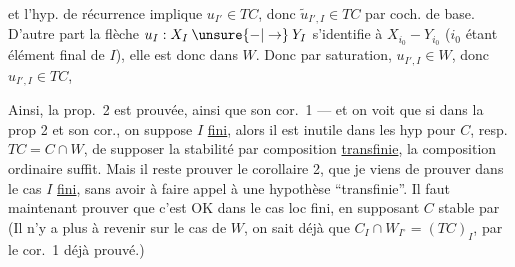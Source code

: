 
et l’hyp. de récurrence implique $u_{I'}\in TC$, donc $\widetilde u_{I',I}\in TC$ par coch. de base. D’autre part la flèche $u_I:X_I\mathbin{\unsure{-|\to}}Y_I$ s’identifie à $X_{i_0}\mathbin{-}Y_{i_0}$ ($i_0$ étant élément final de $I$), elle est donc dans $W$. Donc par saturation, $u_{I',I}\in W$, donc $u_{I',I}\in TC$, 

Ainsi, la prop.~2 est prouvée, ainsi que son cor.~1 --- et on voit que si dans la prop 2 et son cor., on suppose $I$ \uline{fini}, alors il est inutile dans les hyp pour $C$, resp. $TC=C\cap W$, de supposer la stabilité par composition \uline{transfinie}, la composition ordinaire suffit. Mais il reste  prouver le corollaire 2, que je viens de prouver dans le cas  $I$ \uline{fini}, sans avoir à faire appel à une hypothèse ``transfinie''. Il faut maintenant prouver que c’est  OK  dans le cas loc fini, en supposant $C$ stable par   \unsure{!} (Il n’y a plus à revenir sur le cas de $W$,  on sait déjà  que $C_I\cap W_{I^\circ}=(TC)_I$, par le cor.~1 déjà prouvé.)


